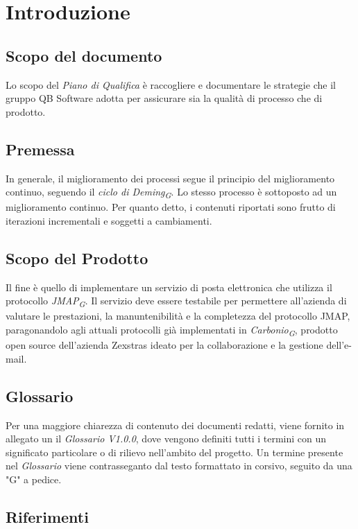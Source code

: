 \section{Introduzione} \label{intro}

\subsection{Scopo del documento}
Lo scopo del \textit{Piano di Qualifica} è raccogliere e documentare le strategie che il gruppo QB Software
adotta per assicurare sia la qualità di processo che di prodotto.

\subsection{Premessa}
In generale, il miglioramento dei processi segue il principio del miglioramento
continuo, seguendo il \textit{ciclo di Deming\textsubscript{G}}. Lo stesso processo è 
sottoposto ad un miglioramento continuo. Per quanto detto, i contenuti riportati sono frutto
di iterazioni incrementali e soggetti a cambiamenti.


\subsection{Scopo del Prodotto}
Il fine è quello di implementare un servizio di posta elettronica che utilizza il protocollo \textit{JMAP\textsubscript{G}}.
Il servizio deve essere testabile per permettere all'azienda di valutare le prestazioni, la manuntenibilità e 
la completezza del protocollo JMAP, paragonandolo agli attuali protocolli già implementati in 
\textit{Carbonio\textsubscript{G}}, prodotto open source dell'azienda Zexstras ideato per la collaborazione 
e la gestione dell'e-mail.


\subsection{Glossario}
Per una maggiore chiarezza di contenuto dei documenti redatti, viene fornito in allegato un il \textit{Glossario V1.0.0}, 
dove vengono definiti tutti i termini con un significato particolare o di rilievo nell'ambito del progetto. 
Un termine presente nel \textit{Glossario} viene contrasseganto dal testo formattato in corsivo, seguito da una "G"
a pedice.


\subsection{Riferimenti}
